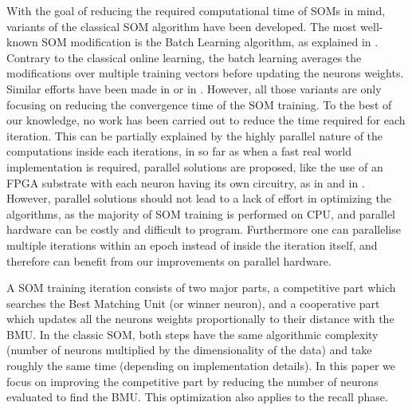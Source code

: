	With the goal of reducing the required computational time of SOMs in mind, variants of the classical SOM algorithm have been developed. The most well-known SOM modification is the Batch Learning algorithm, as explained in  \cite{cottrell:hal-01796059}. Contrary to the classical online learning, the batch learning averages the modifications over multiple training vectors before updating the neurons weights. Similar efforts have been made in \cite{fiannaca2013simulated} or in \cite{oyana2012new}. However, all those variants are only focusing on reducing the convergence time of the SOM training. To the best of our knowledge, no work has been carried out to reduce the time required for each iteration. This can be partially explained by the highly parallel nature of the computations inside each iterations, in so far as when a fast real world implementation is required, parallel solutions are proposed, like the use of an FPGA substrate with each neuron having its own circuitry, as in \cite{abadi2018scalable} and in \cite{huang2017hardware}. However, parallel solutions should not lead to a lack of effort in optimizing the algorithms, as the majority of SOM training is performed on CPU, and parallel hardware can be costly and difficult to program. Furthermore one can parallelise multiple iterations within an epoch instead of inside the iteration itself, and therefore can benefit from our improvements on parallel hardware.

	A SOM training iteration consists of two major parts, a competitive part which searches the Best Matching Unit (or winner neuron), and a cooperative part which updates all the neurons weights proportionally to their distance with the BMU. In the classic SOM, both steps have the same algorithmic complexity (number of neurons multiplied by the dimensionality of the data) and take roughly the same time (depending on implementation details). In this paper we focus on improving the competitive part by reducing the number of neurons evaluated to find the BMU. This optimization also applies to the recall phase.


